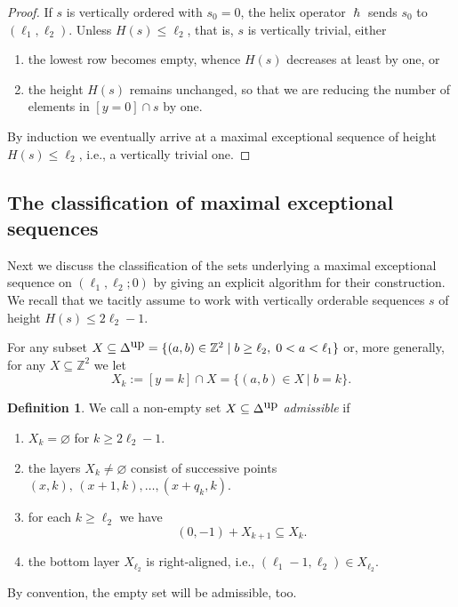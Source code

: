 \documentclass[11pt]{article}
\theoremstyle{definition}
\newtheorem{defi}[theo]{Definition}
\numberwithin{equation}{section}
\newcommand{\Z}{\mathbb Z}
\newcommand{\kst }{\,|\;}
\newcommand{\cl}{s}
\newcommand{\DeltaUp}{\Delta^{\mbox{\tiny up}}}
\newcommand{\mes}{maximal exceptional sequence}
\newcommand{\helix}{\hslash}
\begin{document}
\begin{proof}
If $\cl$ is vertically ordered with $\cl_0=0$, 
the helix operator $\helix$ sends $\cl_0$ to
$(\ell_1,\ell_2)$. Unless $H(\cl)\leq \ell_2$, 
that is, $\cl$ is vertically trivial, either 
\begin{enumerate}
\item[(i)]
the lowest row becomes empty, whence $H(\cl)$ 
decreases at least by one, or
\vspace{1ex}
\item[(ii)]
the height $H(\cl)$ remains unchanged, so that 
we are reducing the number of elements in 
$[y=0]\cap\cl$ by one.
\end{enumerate}
By induction we eventually arrive at a {\mes} 
of height $H(\cl)\leq\ell_2$, i.e., a 
vertically trivial one.
\end{proof}

\subsection{The classification of {\mes}s}
\label{subsec:ClassProdCase}
Next we discuss the classification of the
sets underlying a {\mes} on 
$(\ell_1,\ell_2;0)$ by giving an explicit 
algorithm for their construction. We recall
that we tacitly assume to work with
vertically orderable sequences $\cl$ of height
$H(\cl)\leq2\ell_2-1$.

For any subset $X\subseteq\DeltaUp=
\{(a,b)\in\Z^2\mid b\geq\ell_2,\; 
0<a<\ell_1\}$ 
or, more generally, for any
$X\subseteq\Z^2$ we let
$$
X_k:=[y=k]\cap X=\{(a,b)\in X\kst b=k\}.
$$

\begin{defi}
\label{def:AdmSetPC}
We call a non-empty set $X\subseteq
\DeltaUp$ {\em admissible} if
\begin{enumerate}
\item[(Ai)]
$X_k=\varnothing$ for $k\geq 2\ell_2-1$.
\vspace{1ex}
\item[(Aii)]
the layers $X_k\not=\varnothing$ consist 
of successive points $(x,k),\,(x+1,k),
\ldots,(x+q_k,k)$.
\vspace{1ex}
\item[(Aiii)]
for each $k\geq\ell_2$ we have 
$$
(0,-1)+X_{k+1}\subseteq X_k.
$$
\item[(Aiv)]
the bottom layer $X_{\ell_2}$ is 
right-aligned, i.e., $(\ell_1-1,\ell_2)
\in X_{\ell_2}$.
\end{enumerate}

By convention, the empty set will be 
admissible, too.
\end{defi}
\end{document}
